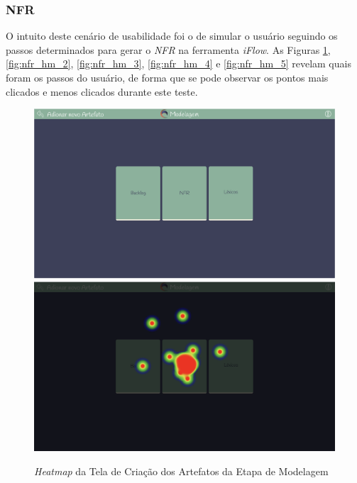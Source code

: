 \subsubsection{NFR}

O intuito deste cenário de usabilidade foi o de simular o usuário seguindo os passos determinados para gerar o \textit{NFR} na ferramenta \textit{iFlow}. As Figuras \ref{fig:nfr_hm_1}, \ref{fig:nfr_hm_2}, \ref{fig:nfr_hm_3}, \ref{fig:nfr_hm_4} e \ref{fig:nfr_hm_5} revelam quais foram os passos do usuário, de forma que se pode observar os pontos mais clicados e menos clicados durante este teste.

\begin{figure}[]
  \begin{center}
      \caption{{\textit{Heatmap} da Tela de Criação dos Artefatos da Etapa de Modelagem}}
      \label{fig:nfr_hm_1}
      \includegraphics[scale=0.45]{figuras/UsabilityHub/nfr/1.png}
      \includegraphics[scale=0.45]{figuras/UsabilityHub/nfr/2.png}
  \end{center}
\end{figure}

